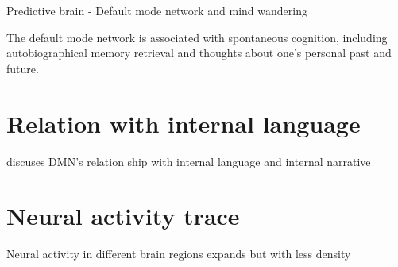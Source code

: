 \begin{frame}[allowframebreaks]{Predictive brain - Default mode network and mind wandering}
    
    The default mode network is associated with spontaneous cognition, including autobiographical memory retrieval and thoughts about one’s personal past and future.
    \cite{raichle-2015-the-brains-default-mode-network, andrews-hanna-2010-evidence-for-the-default-networks-role-in-spontaneous-cognition}
    
    
    \section{Relation with internal language}
        \cite{menon-2023-20-years-of-the-default-mode-network-a-review-and-synthesis} discuses DMN's relation ship with internal language and internal narrative
    
    
    \section{Neural activity trace}
        Neural activity in different brain regions expands but with less density
        \cite{alderson-day-2016-the-brains-conversation-with-itself-neural-substrates-of-dialogic-inner-speech}


\end{frame}